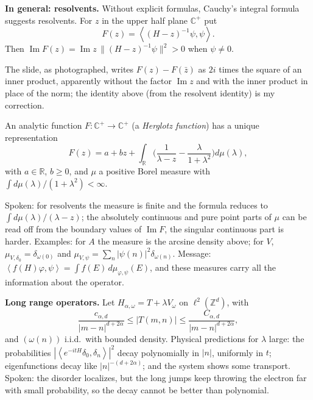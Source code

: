 \medskip\noindent
{\bf In general: resolvents.} Without
explicit formulas, Cauchy's integral formula
suggests resolvents. For $z$ in the upper
half plane $\mathbb{C}^+$ put
$$
F(z) = \left\langle{} (H-z)^{-1}\psi,\psi
\right\rangle{}.
$$
Then $\operatorname{Im} F(z) =
\operatorname{Im} z\,
\|(H-z)^{-1}\psi\|^2 > 0$ when $\psi \neq 0$.

\begin{remark}
\label{remark-matos-resolvent-slide}
The slide, as photographed, writes
$F(z) - F(\bar z)$ as $2i$ times the square
of an inner product, apparently without the
factor $\operatorname{Im} z$ and with the
inner product in place of the norm; the
identity above (from the resolvent identity)
is my correction.
\end{remark}

\begin{theorem}
\label{theorem-herglotz}
An analytic function
$F : \mathbb{C}^+ \to \mathbb{C}^+$ (a
\emph{Herglotz function}) has a unique
representation
$$
F(z) = a + bz + \int_{\mathbb{R}}
\Big(\frac{1}{\lambda - z}
- \frac{\lambda}{1+\lambda^2}\Big)
d\mu(\lambda),
$$
with $a \in \mathbb{R}$, $b \ge 0$, and
$\mu$ a positive Borel measure with
$\int d\mu(\lambda)/(1+\lambda^2) < \infty$.
\end{theorem}

\noindent
Spoken: for resolvents the measure is finite
and the formula reduces to
$\int d\mu(\lambda)/(\lambda - z)$; the
absolutely continuous and pure point parts
of $\mu$ can be read off from the boundary
values of $\operatorname{Im} F$, the
singular continuous part is harder.
Examples: for $A$ the measure is the arcsine
density above; for $V$,
$\mu_{V,\delta_0} = \delta_{\omega(0)}$ and
$\mu_{V,\psi} = \sum_n |\psi(n)|^2
\delta_{\omega(n)}$. Message:
$\left\langle{} f(H)\varphi,\psi
\right\rangle{} = \int f(E)\,
d\mu_{\varphi,\psi}(E)$, and these measures
carry all the information about the
operator.

\medskip\noindent
{\bf Long range operators.} Let
$H_{\alpha,\omega} = T + \lambda V_\omega$ on
$\ell^2(\mathbb{Z}^d)$, with
$$
\frac{c_{\alpha,d}}{|m-n|^{d+2\alpha}}
\le |T(m,n)| \le
\frac{C_{\alpha,d}}{|m-n|^{d+2\alpha}},
$$
and $(\omega(n))$ i.i.d.\ with bounded
density. Physical predictions for $\lambda$
large: the probabilities
$|\left\langle{} e^{-itH}\delta_0,\delta_n
\right\rangle{}|^2$ decay polynomially in
$|n|$, uniformly in $t$; eigenfunctions
decay like $|n|^{-(d+2\alpha)}$; and the
system shows some transport. Spoken: the
disorder localizes, but the long jumps keep
throwing the electron far with small
probability, so the decay cannot be better
than polynomial.

